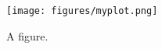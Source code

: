 \begin{figure}[h!]
    \centering
    \texttt{[image: figures/myplot.png]}
    \caption{A figure.}
    \label{fig:fig1}
\end{figure}
